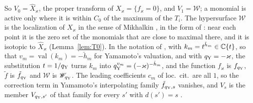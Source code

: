 So $V_0=\widehat X_\varkappa$, the proper transform of $X_\varkappa=\{f_\varkappa=0\}$, and $V_1=\mathscr W$; a monomial is active only where it is within
$C_0$ of the maximum of the $T_i$. The hypersurface $\mathscr W$ is the localization of $X_\varkappa$ in the sense of Mikhalkin
\cite{Mikhalkin}, in the form of \cite[Def.~3.1]{Ya16}: near each point it is the zero set of the monomials that are close to
maximal there, and it is isotopic to $\widehat X_\varkappa$ (Lemma~\ref{lem:T0}). In the notation of \cite[\S3]{Ya16}, with
$k_m=t^{\check h_m}\in\mathbb C\{t\}$, so that $v_m=\operatorname{val}(k_m)=-\check h_m$ for Yamamoto's valuation, and with
$q_{\rm Y}=-\varkappa$, the substitution $t=1/q_{\rm Y}$ turns $k_m$ into $q_{\rm Y}^{v_m}=(-\varkappa)^{-\check h_m}$, and the function $f_\varkappa$ is $f_{q_{\rm Y}}$, $\tilde f$ is
$\tilde f_{q_{\rm Y}}$ and $\mathscr W$ is $\mathscr W_{q_{\rm Y}}$. The leading coefficients $c_m$ of loc.\ cit.\ are all $1$, so the correction
term in Yamamoto's interpolating family $\tilde f_{q_{\rm Y},s}$ vanishes, and $V_s$ is the member $V_{q_{\rm Y},s'}$ of that
family for every $s'$ with $d(s')=s$ \cite[proof of Thm.~3.9]{Ya16}.

